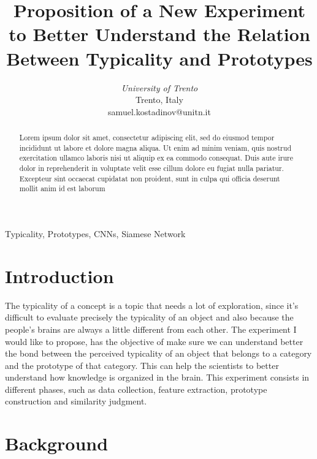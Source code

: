 \documentclass[conference]{IEEEtran}
\begin{document}
\title{Proposition of a New Experiment to Better Understand the Relation Between Typicality and Prototypes}



\author{
\textit{University of Trento}\\
Trento, Italy \\
samuel.kostadinov@unitn.it}


\maketitle

\begin{abstract}

	Lorem ipsum dolor sit amet, consectetur adipiscing elit, sed do eiusmod tempor incididunt ut labore et dolore magna aliqua. Ut enim ad minim veniam, quis nostrud exercitation ullamco laboris nisi ut aliquip ex ea commodo consequat. Duis aute irure dolor in reprehenderit in voluptate velit esse cillum dolore eu fugiat nulla pariatur. Excepteur sint occaecat cupidatat non proident, sunt in culpa qui officia deserunt mollit anim id est laborum

\end{abstract}

\begin{IEEEkeywords}
Typicality, Prototypes, CNNs, Siamese Network
\end{IEEEkeywords}


\section{Introduction}
	
	The typicality of a concept is a topic that needs a lot of exploration, since it's difficult to evaluate precisely the typicality of an object 
	and also because the people's brains are always a little different from each other. The experiment I would like to propose, has the objective of 
	make sure we can understand better the bond between the perceived typicality of an object that belongs to a category and the prototype of that category.
	This can help the scientists to better understand how knowledge is organized in the brain. This experiment consists in different phases, such as
	data collection, feature extraction, prototype construction and similarity judgment.


\section{Background}
\end{document}
